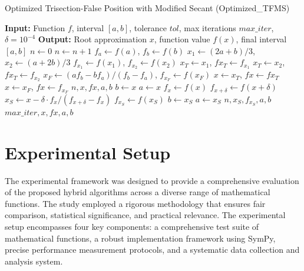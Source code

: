 \documentclass[amsmath, amssymb, aps]{revtex4-2}
\begin{document}
\begin{algorithm}[H]
\caption{Optimized Trisection-False Position with Modified Secant (Optimized\_TFMS)}
\begin{algorithmic}[1]
\State \textbf{Input:} Function $f$, interval $[a, b]$, tolerance $tol$, max iterations $max\_iter$, $\delta = 10^{-4}$
\State \textbf{Output:} Root approximation $x$, function value $f(x)$, final interval $[a, b]$
\State $n \gets 0$
    \State $n \gets n + 1$
    \State $f_a \gets f(a)$, $f_b \gets f(b)$
    \State $x_1 \gets (2a + b)/3$, $x_2 \gets (a + 2b)/3$
    \State $f_{x_1} \gets f(x_1)$, $f_{x_2} \gets f(x_2)$
        \State $x_T \gets x_1$, $fx_T \gets f_{x_1}$
    \Else
        \State $x_T \gets x_2$, $fx_T \gets f_{x_2}$
    \EndIf
    \State $x_F \gets (a f_b - b f_a)/(f_b - f_a)$, $f_{x_F} \gets f(x_F)$
        \State $x \gets x_T$, $fx \gets fx_T$
    \Else
        \State $x \gets x_F$, $fx \gets f_{x_F}$
    \EndIf
        \State \Return $n, x, fx, a, b$
    \EndIf
        \State $b \gets x$
    \Else
        \State $a \gets x$
    \EndIf
    \State $f_x \gets f(x)$
    \State $f_{x+\delta} \gets f(x + \delta)$
    \State $x_S \gets x - \delta \cdot f_x / (f_{x+\delta} - f_x)$
        \State $f_{x_S} \gets f(x_S)$
                \State $b \gets x_S$
            \Else
                \State $a \gets x_S$
            \EndIf
                \State \Return $n, x_S, f_{x_S}, a, b$
            \EndIf
        \EndIf
    \EndIf
\EndWhile
\State \Return $max\_iter, x, fx, a, b$
\end{algorithmic}
\end{algorithm}


\setlength{\parskip}{1.5ex plus 0.5ex minus 0.2ex}

\section{Experimental Setup}\label{sec:experimental}

The experimental framework was designed to provide a comprehensive evaluation of the proposed hybrid algorithms across a diverse range of mathematical functions. The study employed a rigorous methodology that ensures fair comparison, statistical significance, and practical relevance. The experimental setup encompasses four key components: a comprehensive test suite of mathematical functions, a robust implementation framework using SymPy, precise performance measurement protocols, and a systematic data collection and analysis system.
\end{document}
